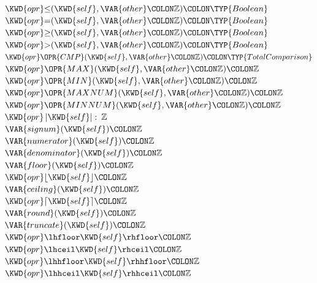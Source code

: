 \begin{Fortress}
\(  \KWD{opr} \mathord{\leq}(\KWD{self}, \VAR{other}\COLON \mathbb{Z})\COLON \TYP{Boolean}\)\\
\(  \KWD{opr} \mathord{=}(\KWD{self}, \VAR{other}\COLON \mathbb{Z})\COLON \TYP{Boolean}\)\\
\(  \KWD{opr} \mathord{\geq}(\KWD{self}, \VAR{other}\COLON \mathbb{Z})\COLON \TYP{Boolean}\)\\
\(  \KWD{opr} \mathord{>}(\KWD{self}, \VAR{other}\COLON \mathbb{Z})\COLON \TYP{Boolean}\)\\
\(  \KWD{opr} \mathord{\OPR{CMP}}(\KWD{self}, \VAR{other}\COLON \mathbb{Z})\COLON \TYP{TotalComparison}\)\\
\(  \KWD{opr} \mathord{\OPR{MAX}}(\KWD{self}, \VAR{other}\COLON \mathbb{Z})\COLON \mathbb{Z}\)\\
\(  \KWD{opr} \mathord{\OPR{MIN}}(\KWD{self}, \VAR{other}\COLON \mathbb{Z})\COLON \mathbb{Z}\)\\
\(  \KWD{opr} \mathord{\OPR{MAXNUM}}(\KWD{self}, \VAR{other}\COLON \mathbb{Z})\COLON \mathbb{Z}\)\\
\(  \KWD{opr} \mathord{\OPR{MINNUM}}(\KWD{self}, \VAR{other}\COLON \mathbb{Z})\COLON \mathbb{Z}\)\\
\(  \KWD{opr} \left|\mathord{\KWD{self}}\right| \mathrel{\mathtt{:}}\mskip 4mu plus 4mu\mathbb{Z}\)\\
\(  \VAR{signum}(\KWD{self})\COLON \mathbb{Z}\)\\
\(  \VAR{numerator}(\KWD{self})\COLON \mathbb{Z}\)\\
\(  \VAR{denominator}(\KWD{self})\COLON \mathbb{Z}\)\\
\(  \VAR{floor}(\KWD{self})\COLON \mathbb{Z}\)\\
\(  \KWD{opr} \lfloor \mathord{\KWD{self}} \rfloor\COLON \mathbb{Z}\)\\
\(  \VAR{ceiling}(\KWD{self})\COLON \mathbb{Z}\)\\
\(  \KWD{opr} \lceil \mathord{\KWD{self}} \rceil\COLON \mathbb{Z}\)\\
\(  \VAR{round}(\KWD{self})\COLON \mathbb{Z}\)\\
\(  \VAR{truncate}(\KWD{self})\COLON \mathbb{Z}\)\\
\(  \KWD{opr} \lhfloor \mathord{\KWD{self}} \rhfloor\COLON \mathbb{Z}\)\\
\(  \KWD{opr} \lhceil \mathord{\KWD{self}} \rhceil\COLON \mathbb{Z}\)\\
\(  \KWD{opr} \lhhfloor \mathord{\KWD{self}} \rhhfloor\COLON \mathbb{Z}\)\\
\(  \KWD{opr} \lhhceil \mathord{\KWD{self}} \rhhceil\COLON \mathbb{Z}\)\\

\end{Fortress}
